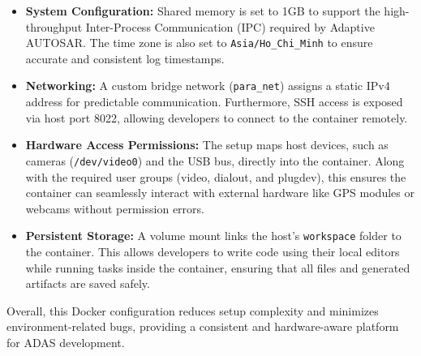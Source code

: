 \begin{itemize}
    \item \textbf{System Configuration:} Shared memory is set to 1GB to support the high-throughput Inter-Process Communication (IPC) required by Adaptive AUTOSAR. The time zone is also set to \texttt{Asia/Ho\_Chi\_Minh} to ensure accurate and consistent log timestamps.
    \item \textbf{Networking:} A custom bridge network (\texttt{para\_net}) assigns a static IPv4 address for predictable communication. Furthermore, SSH access is exposed via host port 8022, allowing developers to connect to the container remotely.
    \item \textbf{Hardware Access Permissions:} The setup maps host devices, such as cameras (\texttt{/dev/video0}) and the USB bus, directly into the container. Along with the required user groups (video, dialout, and plugdev), this ensures the container can seamlessly interact with external hardware like GPS modules or webcams without permission errors.
    \item \textbf{Persistent Storage:} A volume mount links the host's \texttt{workspace} folder to the container. This allows developers to write code using their local editors while running tasks inside the container, ensuring that all files and generated artifacts are saved safely.
\end{itemize}

Overall, this Docker configuration reduces setup complexity and minimizes environment-related bugs, providing a consistent and hardware-aware platform for ADAS development.

